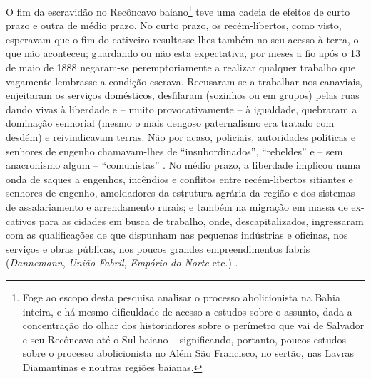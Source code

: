 O fim da escravidão no Recôncavo baiano\footnote{Foge ao escopo desta pesquisa analisar o processo abolicionista na Bahia inteira, e há mesmo dificuldade de acesso a estudos sobre o assunto, dada a concentração do olhar dos historiadores sobre o perímetro que vai de Salvador e seu Recôncavo até o Sul baiano -- significando, portanto, poucos estudos sobre o processo abolicionista no Além São Francisco, no sertão, nas Lavras Diamantinas e noutras regiões baianas.} teve uma cadeia de efeitos de curto prazo e outra de médio prazo. No curto prazo, os recém-libertos, como visto, esperavam que o fim do cativeiro resultasse-lhes também no seu acesso à terra, o que não aconteceu; guardando ou não esta expectativa, por meses a fio após o 13 de maio de 1888 negaram-se peremptoriamente a realizar qualquer trabalho que vagamente lembrasse a condição escrava. Recusaram-se a trabalhar nos canaviais, enjeitaram os serviços domésticos, desfilaram (sozinhos ou em grupos) pelas ruas dando vivas à liberdade e -- muito provocativamente -- à igualdade, quebraram a dominação senhorial (mesmo o mais dengoso paternalismo era tratado com desdém) e reivindicavam terras. Não por acaso, policiais, autoridades políticas e senhores de engenho chamavam-lhes de ``insubordinados'', ``rebeldes'' e -- sem anacronismo algum -- ``comunistas'' \cite[p.~119-160]{fraga_encruzilhadas_2014}. No médio prazo, a liberdade implicou numa onda de saques a engenhos, incêndios e conflitos entre recém-libertos sitiantes e senhores de engenho, amoldadores da estrutura agrária da região e dos sistemas de assalariamento e arrendamento rurais; e também na migração em massa de ex-cativos para as cidades em busca de trabalho, onde, descapitalizados, ingressaram com as qualificações de que dispunham nas pequenas indústrias e oficinas, nos serviços e obras públicas, nos poucos grandes empreendimentos fabris (\textit{Dannemann}, \textit{União Fabril}, \textit{Empório do Norte} etc.) \cite[p.~161-241]{fraga_encruzilhadas_2014}.

